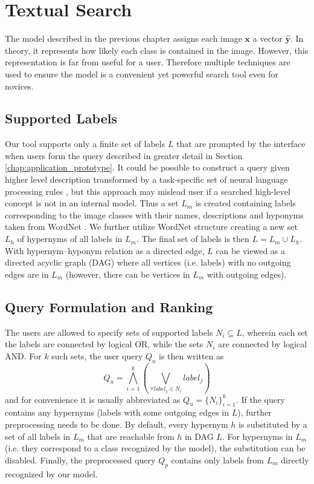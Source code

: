 \chapter{Textual Search}\label{chap:text_search}

The model described in the previous chapter assigns each image $\bm{x}$ a vector $\bm{\hat{y}}$. In theory, it represents how likely each class is contained in the image. However, this representation is far from useful for a user. Therefore multiple techniques are used to ensure the model is a convenient yet powerful search tool even for novices.

\section{Supported Labels}
Our tool supports only a finite set of labels $L$ that are prompted by the interface when users form the query described in greater detail in Section \ref{chap:application_prototype}. It could be possible to construct a query given higher level description transformed by a task-specific set of neural language processing rules \cite{moumtzidou2017verge}, but this approach may mislead user if a searched high-level concept is not in an internal model. Thus a set $L_m$ is created containing labels corresponding to the image classes with their \textsf{names}, \textsf{descriptions} and \textsf{hyponyms} taken from WordNet \cite{WordNet}. We further utilize WordNet structure creating a new set $L_h$ of hypernyms of all labels in $L_m$. The final set of labels is then $L=L_m\cup L_h$. With hypernym--hyponym relation as a directed edge, $L$ can be viewed as a directed acyclic graph (DAG) where all vertices (i.e. labels) with no outgoing edges are in $L_m$ (however, there can be vertices in $L_m$ with outgoing edges).

\section{Query Formulation and Ranking}\label{sec:query_formulation_and_ranking}
The users are allowed to specify sets of supported labels $N_i \subseteq L$, wherein each set the labels are connected by logical \textsf{OR}, while the sets $N_i$ are connected by logical \textsf{AND}. For $k$ such sets, the user query $Q_u$ is then written as
\begin{equation}
	Q_u=\bigwedge\limits_{i=1}^k\left(\bigvee\limits_{\forall label_j\in N_i} label_j \right)
\end{equation}
and for convenience it is usually abbreviated as $Q_u=\{N_i\}_{i=1}^k$. If the query contains any hypernyms (labels with some outgoing edges in $L$), further preprocessing needs to be done. By default, every hypernym $h$ is substituted by a set of all labels in $L_m$ that are reachable from $h$ in DAG $L$. For hypernyms in $L_m$ (i.e. they correspond to a class recognized by the model), the substitution can be disabled. Finally, the preprocessed query $Q_p$ contains only labels from $L_m$ directly recognized by our model.

